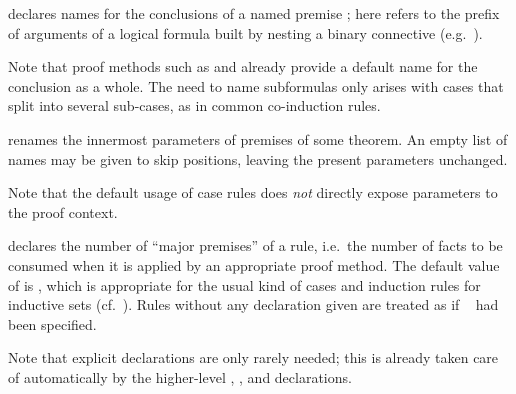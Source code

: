 \begin{isabellebody}
\begin{isamarkuptext}
\begin{descr}
  \item [\mbox{\isa{case{\isacharunderscore}conclusion}}~\isa{{\isachardoublequote}c\ d\isactrlsub {\isadigit{1}}\ {\isasymdots}\ d\isactrlsub k{\isachardoublequote}}] declares names for the conclusions of a named premise
  ; here  refers to the
  prefix of arguments of a logical formula built by nesting a binary
  connective (e.g.\ \isa{{\isachardoublequote}{\isasymor}{\isachardoublequote}}).
  
  Note that proof methods such as \mbox{} and \mbox{} already provide a default name for the conclusion as a
  whole.  The need to name subformulas only arises with cases that
  split into several sub-cases, as in common co-induction rules.

  \item [\mbox{\isa{params}}~\isa{{\isachardoublequote}p\isactrlsub {\isadigit{1}}\ {\isasymdots}\ p\isactrlsub m\ {\isasymAND}\ {\isasymdots}\ q\isactrlsub {\isadigit{1}}\ {\isasymdots}\ q\isactrlsub n{\isachardoublequote}}] renames the innermost parameters of
  premises  of some theorem.  An empty list of names
  may be given to skip positions, leaving the present parameters
  unchanged.
  
  Note that the default usage of case rules does \emph{not} directly
  expose parameters to the proof context.
  
  \item [\mbox{\isa{consumes}}~\isa{n}] declares the number of
  ``major premises'' of a rule, i.e.\ the number of facts to be
  consumed when it is applied by an appropriate proof method.  The
  default value of \mbox{} is , which is
  appropriate for the usual kind of cases and induction rules for
  inductive sets (cf.\ ).  Rules without any
  \mbox{} declaration given are treated as if
  \mbox{}~ had been specified.
  
  Note that explicit \mbox{} declarations are only
  rarely needed; this is already taken care of automatically by the
  higher-level \mbox{}, \mbox{}, and
  \mbox{} declarations.


\end{descr}
\end{isamarkuptext}
\end{isabellebody}
